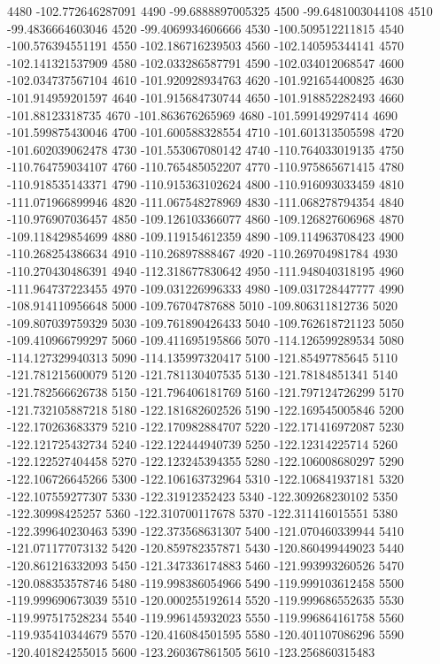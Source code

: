 {4480 -102.772646287091
4490 -99.6888897005325
4500 -99.6481003044108
4510 -99.4836664603046
4520 -99.4069934606666
4530 -100.509512211815
4540 -100.576394551191
4550 -102.186716239503
4560 -102.140595344141
4570 -102.141321537909
4580 -102.033286587791
4590 -102.034012068547
4600 -102.034737567104
4610 -101.920928934763
4620 -101.921654400825
4630 -101.914959201597
4640 -101.915684730744
4650 -101.918852282493
4660 -101.88123318735
4670 -101.863676265969
4680 -101.599149297414
4690 -101.599875430046
4700 -101.600588328554
4710 -101.601313505598
4720 -101.602039062478
4730 -101.553067080142
4740 -110.764033019135
4750 -110.764759034107
4760 -110.765485052207
4770 -110.975865671415
4780 -110.918535143371
4790 -110.915363102624
4800 -110.916093033459
4810 -111.071966899946
4820 -111.067548278969
4830 -111.068278794354
4840 -110.976907036457
4850 -109.126103366077
4860 -109.126827606968
4870 -109.118429854699
4880 -109.119154612359
4890 -109.114963708423
4900 -110.268254386634
4910 -110.26897888467
4920 -110.269704981784
4930 -110.270430486391
4940 -112.318677830642
4950 -111.948040318195
4960 -111.964737223455
4970 -109.031226996333
4980 -109.031728447777
4990 -108.914110956648
5000 -109.76704787688
5010 -109.806311812736
5020 -109.807039759329
5030 -109.761890426433
5040 -109.762618721123
5050 -109.410966799297
5060 -109.411695195866
5070 -114.126599289534
5080 -114.127329940313
5090 -114.135997320417
5100 -121.85497785645
5110 -121.781215600079
5120 -121.781130407535
5130 -121.78184851341
5140 -121.782566626738
5150 -121.796406181769
5160 -121.797124726299
5170 -121.732105887218
5180 -122.181682602526
5190 -122.169545005846
5200 -122.170263683379
5210 -122.170982884707
5220 -122.171416972087
5230 -122.121725432734
5240 -122.122444940739
5250 -122.12314225714
5260 -122.122527404458
5270 -122.123245394355
5280 -122.106008680297
5290 -122.106726645266
5300 -122.106163732964
5310 -122.106841937181
5320 -122.107559277307
5330 -122.31912352423
5340 -122.309268230102
5350 -122.30998425257
5360 -122.310700117678
5370 -122.311416015551
5380 -122.399640230463
5390 -122.373568631307
5400 -121.070460339944
5410 -121.071177073132
5420 -120.859782357871
5430 -120.860499449023
5440 -120.861216332093
5450 -121.347336174883
5460 -121.993993260526
5470 -120.088353578746
5480 -119.998386054966
5490 -119.999103612458
5500 -119.999690673039
5510 -120.000255192614
5520 -119.999686552635
5530 -119.997517528234
5540 -119.996145932023
5550 -119.996864161758
5560 -119.935410344679
5570 -120.416084501595
5580 -120.401107086296
5590 -120.401824255015
5600 -123.260367861505
5610 -123.256860315483
}
